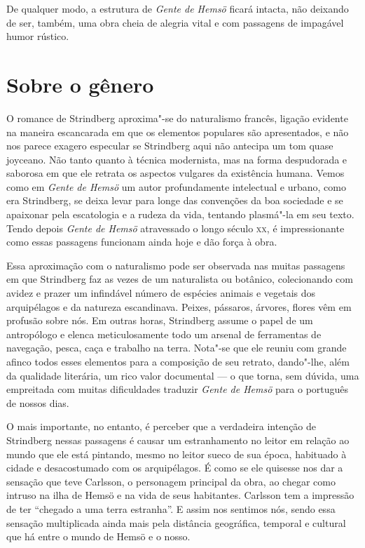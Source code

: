 De qualquer modo, a estrutura de \textit{Gente de Hemsö} ficará intacta, não
deixando de ser, também, uma obra cheia de alegria vital e com
passagens de impagável humor rústico. 

\section{Sobre o gênero}

O romance de Strindberg aproxima"-se do naturalismo
francês, ligação evidente na maneira escancarada em que os elementos
populares são apresentados, e não nos parece exagero
especular se Strindberg aqui não antecipa um tom quase joyceano. 
Não tanto quanto à técnica modernista, mas na forma despudorada e saborosa em
que ele retrata os aspectos vulgares da existência humana.
Vemos como em \textit{Gente de Hemsö} um autor profundamente intelectual 
e urbano, como era Strindberg, se deixa levar para longe das convenções 
da boa sociedade e se apaixonar pela escatologia e a rudeza da vida,
tentando plasmá"-la em seu texto. Tendo depois \textit{Gente de Hemsö} 
atravessado o longo século \textsc{xx}, é impressionante como essas
passagens funcionam ainda hoje e dão força à obra. 

Essa aproximação com o naturalismo pode ser observada nas muitas passagens em que
Strindberg faz as vezes de um naturalista ou botânico, colecionando com
avidez e prazer um infindável número de espécies animais e vegetais dos
arquipélagos e da natureza escandinava. Peixes, pássaros, árvores,
flores vêm em profusão sobre nós. Em outras horas, Strindberg assume o
papel de um antropólogo e elenca meticulosamente todo um arsenal de
ferramentas de navegação, pesca, caça e trabalho na terra. Nota"-se que
ele reuniu com grande afinco todos esses elementos para a composição de
seu retrato, dando"-lhe, além da qualidade literária, um rico valor documental --- o que torna, sem dúvida, uma empreitada com muitas dificuldades traduzir 
\textit{Gente de Hemsö} para o português de nossos dias.

O mais importante, no entanto, é perceber que a verdadeira intenção de
Strindberg nessas passagens é causar um estranhamento no leitor em
relação ao mundo que ele está pintando, mesmo no leitor sueco de sua
época, habituado à cidade e desacostumado com os arquipélagos. É como
se ele quisesse nos dar a sensação que teve Carlsson, o personagem
principal da obra, ao chegar como intruso na ilha de Hemsö e na vida de
seus habitantes. Carlsson tem a impressão de ter “chegado a uma
terra estranha”. E assim nos sentimos nós, sendo essa sensação
multiplicada ainda mais pela distância geográfica, temporal e cultural
que há entre o mundo de Hemsö e o nosso.

